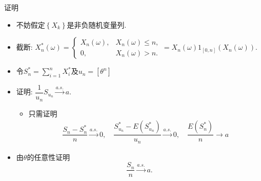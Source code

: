 \documentclass[Prob-All.tex]{subfiles}
\begin{document}
\begin{frame}{证明}
	\begin{itemize}[<+-|alert@+>]
	\item 不妨假定${\left\{X_{k}\right\}}$是非负随机变量列.
	\item 截断: $X_{n}^{*}(\omega)={\left\{\begin{array}{ll}
		X_{n}(\omega), &     X_{n}(\omega) \leq n, \\
		0, &     X_{n}(\omega)>n .
		\end{array}=X_{n}(\omega) 1_{[0, n]}\left(X_{n}(\omega)\right). \right.}$
	 \item 令$S_n^*=\sum_{i=1}^nX_i^*$及$u_n=[\theta^n]$
	 \item 证明: $\dfrac{1}{u_{n}} S_{u_{n}} \stackrel{a.s.}{\rightarrow} a$.
	 \begin{itemize}[<+-|alert@+>]
	 \item 只需证明
	 \begin{align*}
		\dfrac{S_n-S_n^*}{n}\stackrel{a.s.}{\rightarrow} 0, \quad \dfrac{S_{u_n}^*-E(S_{u_n}^*)}{u_n}\stackrel{a.s.}{\rightarrow}  0, \quad \dfrac{E(S_n^*)}{n}\rightarrow a
	 \end{align*}
	\end{itemize}
    \item 由$\theta$的任意性证明
    \[
\frac{S_{n}}{n}\stackrel{a.s.}{\rightarrow} a.
\]


	\end{itemize}


\end{frame}









\end{document}
